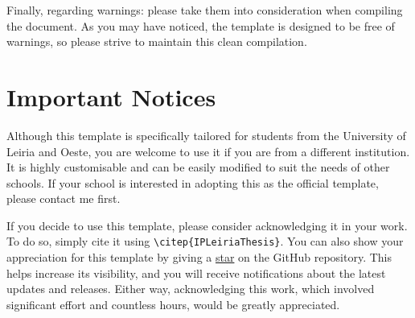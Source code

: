 Finally, regarding warnings: please take them into consideration when compiling the document. As you may have noticed, the template is designed to be free of warnings, so please strive to maintain this clean compilation.

\section{Important Notices}
Although this template is specifically tailored for students from the University of Leiria and Oeste, you are welcome to use it if you are from a different institution. It is highly customisable and can be easily modified to suit the needs of other schools. If your school is interested in adopting this as the official template, please contact me first.

If you decide to use this template, please consider acknowledging it in your work. To do so, simply cite it using \verb|\citep{IPLeiriaThesis}|. You can also show your appreciation for this template by giving a \href{https://github.com/joseareia/ipleiria-thesis/stargazers}{star} on the GitHub repository. This helps increase its visibility, and you will receive notifications about the latest updates and releases. Either way, acknowledging this work, which involved significant effort and countless hours, would be greatly appreciated.
